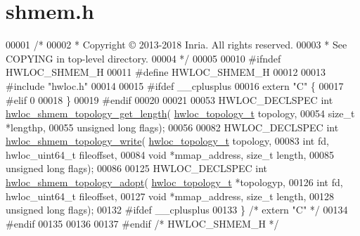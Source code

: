 \hypertarget{a00173_source}{}\section{shmem.\+h}
\label{a00173_source}

\begin{DoxyCode}
00001 \textcolor{comment}{/*}
00002 \textcolor{comment}{ * Copyright © 2013-2018 Inria.  All rights reserved.}
00003 \textcolor{comment}{ * See COPYING in top-level directory.}
00004 \textcolor{comment}{ */}
00005 
00010 \textcolor{preprocessor}{#ifndef HWLOC\_SHMEM\_H}
00011 \textcolor{preprocessor}{#define HWLOC\_SHMEM\_H}
00012 
00013 \textcolor{preprocessor}{#include "hwloc.h"}
00014 
00015 \textcolor{preprocessor}{#ifdef \_\_cplusplus}
00016 \textcolor{keyword}{extern} \textcolor{stringliteral}{"C"} \{
00017 \textcolor{preprocessor}{#elif 0}
00018 \}
00019 \textcolor{preprocessor}{#endif}
00020 
00021 
00053 HWLOC\_DECLSPEC \textcolor{keywordtype}{int} \hyperlink{a00226_ga772ab52750cdd0eec85128df24888001}{hwloc\_shmem\_topology\_get\_length}(
      \hyperlink{a00186_ga9d1e76ee15a7dee158b786c30b6a6e38}{hwloc\_topology\_t} topology,
00054                                                    \textcolor{keywordtype}{size\_t} *lengthp,
00055                                                    \textcolor{keywordtype}{unsigned} \textcolor{keywordtype}{long} flags);
00056 
00082 HWLOC\_DECLSPEC \textcolor{keywordtype}{int} \hyperlink{a00226_ga61b20e346fc76f76420e3a88cc80a671}{hwloc\_shmem\_topology\_write}(
      \hyperlink{a00186_ga9d1e76ee15a7dee158b786c30b6a6e38}{hwloc\_topology\_t} topology,
00083                                               \textcolor{keywordtype}{int} fd, hwloc\_uint64\_t fileoffset,
00084                                               \textcolor{keywordtype}{void} *mmap\_address, \textcolor{keywordtype}{size\_t} length,
00085                                               \textcolor{keywordtype}{unsigned} \textcolor{keywordtype}{long} flags);
00086 
00125 HWLOC\_DECLSPEC \textcolor{keywordtype}{int} \hyperlink{a00226_ga21545bd0f09d9b554c8e60a630e0e629}{hwloc\_shmem\_topology\_adopt}(
      \hyperlink{a00186_ga9d1e76ee15a7dee158b786c30b6a6e38}{hwloc\_topology\_t} *topologyp,
00126                                               \textcolor{keywordtype}{int} fd, hwloc\_uint64\_t fileoffset,
00127                                               \textcolor{keywordtype}{void} *mmap\_address, \textcolor{keywordtype}{size\_t} length,
00128                                               \textcolor{keywordtype}{unsigned} \textcolor{keywordtype}{long} flags);
00132 \textcolor{preprocessor}{#ifdef \_\_cplusplus}
00133 \} \textcolor{comment}{/* extern "C" */}
00134 \textcolor{preprocessor}{#endif}
00135 
00136 
00137 \textcolor{preprocessor}{#endif }\textcolor{comment}{/* HWLOC\_SHMEM\_H */}\textcolor{preprocessor}{}
\end{DoxyCode}
